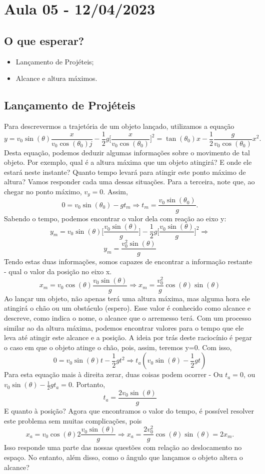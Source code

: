 \documentclass[PhysicsI/physics_notes.tex]{subfiles}
\begin{document}
\section{Aula 05 - 12/04/2023}
\subsection{O que esperar?}
\begin{itemize}
	\item Lançamento de Projéteis;
	\item Alcance e altura máximos.
\end{itemize}
\subsection{Lançamento de Projéteis}
Para descrevermos a trajetória de um objeto lançado, utilizamos a equação
$$
	y = v_{0}\sin{(\theta )}\frac{x}{v_{0}\cos{(\theta _0)}j} - \frac{1}{2}g\biggl[\frac{x}{v_{0}\cos{(\theta _0)}}\biggr]^{2} = \tan{(\theta _{0})}x-\frac{1}{2}\frac{g}{v_{0}\cos{(\theta _{0})}}x^{2}.
$$
Desta equação, podemos deduzir algumas informações sobre o movimento de tal objeto. Por exemplo, qual é a altura máxima
que um objeto atingirá? E onde ele estará neste instante? Quanto tempo levará para atingir este ponto máximo de altura?
Vamos responder cada uma dessas situações. Para a terceira, note que, ao chegar no ponto máximo, $v_{y}=0.$ Assim,
$$
	0 = v_{0}\sin{(\theta_{0})}-gt_{m} \Rightarrow \boxed{t_{m} = \frac{v_{0}\sin{(\theta_{0})}}{g}.}
$$
Sabendo o tempo, podemos encontrar o valor dela com reação ao eixo y:
$$
	y_{m} = v_{0}\sin{(\theta )}\biggl[\frac{v_{0}\sin{(\theta )}}{g}\biggr] - \frac{1}{2}g\biggl[\frac{v_{0}\sin{(\theta )}}{g}\biggr]^{2} \Rightarrow
$$
$$
	\boxed{y_{m}=\frac{v_{0}^{2}\sin{(\theta )}}{g}}
$$
Tendo estas duas informações, somos capazes de encontrar a informação restante - qual o valor da posição no eixo x.
$$
	x_{m} = v_{0}\cos{(\theta )}\frac{v_{0}\sin{(\theta )}}{g} \Rightarrow \boxed{x_{m} = \frac{v_{0}^{2}}{g}\cos{(\theta )}\sin{(\theta )}}
$$
Ao lançar um objeto, não apenas terá uma altura máxima, mas alguma hora ele atingirá o chão ou um obstáculo (espero). Esse valor é
conhecido como alcance e descreve, como indica o nome, o alcance que o arremesso terá. Com um processo similar ao da
altura máxima, podemos encontrar valores para o tempo que ele leva até atingir este alcance e a posição. A ideia por trás deste
raciocínio é pegar o caso em que o objeto atinge o chão, pois, assim, teremos y=0. Com isso,
$$
	0 = v_{0}\sin{(\theta )}t - \frac{1}{2}gt^{2} \Rightarrow t_{a}(v_{0}\sin{(\theta )}-\frac{1}{2}gt)
$$
Para esta equação mais à direita zerar, duas coisas podem ocorrer - Ou $t_{a} = 0$, ou $v_{0}\sin{(\theta )} - \frac{1}{2}gt_{a}=0.$
Portanto,
$$
	\boxed{t_{a} = \frac{2v_{0}\sin{(\theta )}}{g}}
$$
E quanto à posição? Agora que encontramos o valor do tempo, é possível resolver este problema sem muitas complicações, pois
$$
	x_{a} = v_{0}\cos{(\theta )}2\frac{v_{0}\sin{(\theta )}}{g} \Rightarrow x_{a} = \frac{2v_{0}^{2}}{g}\cos{(\theta )}\sin{(\theta )} = 2x_{m}.
$$
Isso responde uma parte das nossas questões com relação ao deslocamento no espaço. No entanto, além disso, como o ângulo que
lançamos o objeto altera o alcance?
\end{document}

